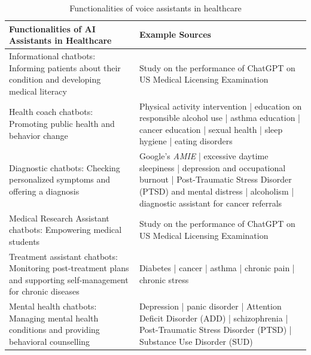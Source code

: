 \begin{table}
\begin{center}
\caption{Functionalities of voice assistants in healthcare}
\centering
\label{table:bad_table}
\begin{tabular}{ | m{6cm} | m{8cm} | }
\hline 

\hline
\textbf{Functionalities of AI Assistants in Healthcare} & \textbf{Example Sources}  \\ \hline
\hline
Informational chatbots: Informing patients about their condition and developing medical literacy & Study on the performance of ChatGPT on US Medical Licensing Examination \cite{chaGPTpassesUSMLE2023} \\ 
\hline
Health coach chatbots: Promoting public health and behavior change & Physical activity intervention \cite{FitTrack2003, walkingincentives2020} | education on responsible alcohol use \cite{alcoholism2016} | asthma education \cite{max2021} | cancer education \cite{vik2020} | sexual health \cite{shihbot2017} | sleep hygiene \cite{sleepcoach2021} | eating disorders \cite{Tessa2022} \\
\hline 
Diagnostic chatbots: Checking personalized symptoms and offering a diagnosis & Google's \textit{AMIE} \cite{AMIE2024} | excessive daytime sleepiness \cite{eds2014} | depression and occupational burnout \cite{mdddiagnosis2017, vickybot2023} | Post-Traumatic Stress Disorder (PTSD) and mental distress \cite{SimCoach2016, mentalhealthbarriers2017} | alcoholism \cite{alcoholism2016} | diagnostic assistant for cancer referrals \cite{decisioncancer2006} \\
\hline 
Medical Research Assistant chatbots: Empowering medical students & Study on the performance of ChatGPT on US Medical Licensing Examination \cite{chaGPTpassesUSMLE2023}  \\
\hline 
Treatment assistant chatbots: Monitoring post-treatment plans and supporting self-management for chronic diseases & Diabetes \cite{GoogleHomediabetes2018, mydiabetescoach2020} | cancer \cite{vik2020} | asthma \cite{asthma2014, max2021} | chronic pain \cite{selma2020} | chronic stress \cite{hudlicka2013} \\
\hline 
Mental health chatbots: Managing mental health conditions and providing behavioral counselling & Depression \cite{woebot2017, depressioncoach2023, wysa2023} | panic disorder \cite{panicbot2020} | Attention Deficit Disorder (ADD) \cite{adhd2021} | schizophrenia \cite{schizophrenia2010} | Post-Traumatic Stress Disorder (PTSD) \cite{SimCoach2016, mentalhealthbarriers2017} | Substance Use Disorder (SUD) \cite{alcoholism2016, smokingcessation2017, smokingcessation2019, smokecessation2018, noblesetal2020addiction} \\

\end{tabular}
\end{center}
\end{table}
